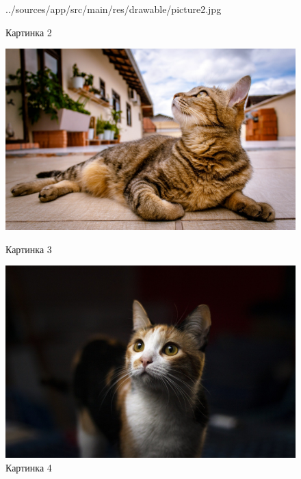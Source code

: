 \documentclass[12pt, a4paper, simple]{eskdtext}
\begin{document}
\begin{figure}[!h]
\begin{minipage}{0.19\textwidth}
                {../sources/app/src/main/res/drawable/picture2.jpg}
            \caption{Картинка 2}
        \end{minipage}
        \begin{minipage}{0.19\textwidth}
            \centering
            \includegraphics[width=\linewidth]
                {../sources/app/src/main/res/drawable/picture3.jpg}
            \caption{Картинка 3}
        \end{minipage}
        \begin{minipage}{0.19\textwidth}
            \centering
            \includegraphics[width=\linewidth]
                {../sources/app/src/main/res/drawable/picture4.jpg}
            \caption{Картинка 4}
        \end{minipage}
        \begin{minipage}{0.19\textwidth}
            \centering

\end{minipage}
\end{figure}
\end{document}
